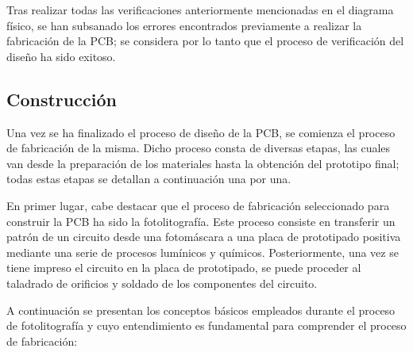 Tras realizar todas las verificaciones anteriormente mencionadas en el diagrama físico, se han subsanado los errores encontrados previamente a realizar la fabricación de la \ac{PCB}; se considera por lo tanto que el proceso de verificación del diseño ha sido exitoso.

\subsection{Construcción}

Una vez se ha finalizado el proceso de diseño de la \ac{PCB}, se comienza el proceso de fabricación de la misma. Dicho proceso consta de diversas etapas, las cuales van desde la preparación de los materiales hasta la obtención del prototipo final; todas estas etapas se detallan a continuación una por una.

En primer lugar, cabe destacar que el proceso de fabricación seleccionado para construir la \ac{PCB} ha sido la fotolitografía. Este proceso consiste en transferir un patrón de un circuito desde una fotomáscara a una placa de prototipado positiva mediante una serie de procesos lumínicos y químicos. Posteriormente, una vez se tiene impreso el circuito en la placa de prototipado, se puede proceder al taladrado de orificios y soldado de los componentes del circuito.

A continuación se presentan los conceptos básicos empleados durante el proceso de fotolitografía y cuyo entendimiento es fundamental para comprender el proceso de fabricación:

